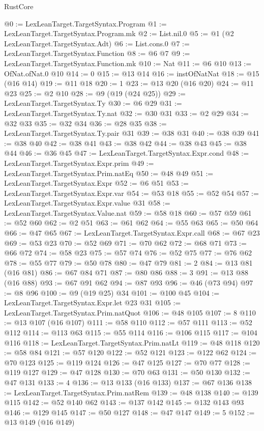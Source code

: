 \begin{lexlean}{RustCore}
\begin{coremodule}
@0 := LexLeanTarget.TargetSyntax.Program
@1 := LexLeanTarget.TargetSyntax.Program.mk
@2 := List.nil.{0}
@5 := @1 (@2 LexLeanTarget.TargetSyntax.Adt)
@6 := List.cons.{0}
@7 := LexLeanTarget.TargetSyntax.Function
@8 := @6 @7
@9 := LexLeanTarget.TargetSyntax.Function.mk
@10 := Nat
@11 := @6 @10
@13 := OfNat.ofNat.{0} @10
@14 := 0
@15 := @13 @14
@16 := instOfNatNat
@18 := @15 (@16 @14)
@19 := @11 @18
@20 := 1
@23 := @13 @20 (@16 @20)
@24 := @11 @23
@25 := @2 @10
@28 := @9 (@19 (@24 @25))
@29 := LexLeanTarget.TargetSyntax.Ty
@30 := @6 @29
@31 := LexLeanTarget.TargetSyntax.Ty.nat
@32 := @30 @31
@33 := @2 @29
@34 := @32 @33
@35 := @32 @34
@36 := @28 @35
@38 := LexLeanTarget.TargetSyntax.Ty.pair @31
@39 := @38 @31
@40 := @38 @39
@41 := @38 @40
@42 := @38 @41
@43 := @38 @42
@44 := @38 @43
@45 := @38 @44
@46 := @36 @45
@47 := LexLeanTarget.TargetSyntax.Expr.cond
@48 := LexLeanTarget.TargetSyntax.Expr.prim
@49 := LexLeanTarget.TargetSyntax.Prim.natEq
@50 := @48 @49
@51 := LexLeanTarget.TargetSyntax.Expr
@52 := @6 @51
@53 := LexLeanTarget.TargetSyntax.Expr.var
@54 := @53 @18
@55 := @52 @54
@57 := LexLeanTarget.TargetSyntax.Expr.value @31
@58 := LexLeanTarget.TargetSyntax.Value.nat
@59 := @58 @18
@60 := @57 @59
@61 := @52 @60
@62 := @2 @51
@63 := @61 @62
@64 := @55 @63
@65 := @50 @64
@66 := @47 @65
@67 := LexLeanTarget.TargetSyntax.Expr.call
@68 := @67 @23
@69 := @53 @23
@70 := @52 @69
@71 := @70 @62
@72 := @68 @71
@73 := @66 @72
@74 := @58 @23
@75 := @57 @74
@76 := @52 @75
@77 := @76 @62
@78 := @55 @77
@79 := @50 @78
@80 := @47 @79
@81 := 2
@84 := @13 @81 (@16 @81)
@86 := @67 @84 @71
@87 := @80 @86
@88 := 3
@91 := @13 @88 (@16 @88)
@93 := @67 @91 @62
@94 := @87 @93
@96 := @46 (@73 @94)
@97 := @8 @96
@100 := @9 (@19 @25) @34
@101 := @100 @45
@104 := LexLeanTarget.TargetSyntax.Expr.let @23 @31
@105 := LexLeanTarget.TargetSyntax.Prim.natQuot
@106 := @48 @105
@107 := 8
@110 := @13 @107 (@16 @107)
@111 := @58 @110
@112 := @57 @111
@113 := @52 @112
@114 := @113 @63
@115 := @55 @114
@116 := @106 @115
@117 := @104 @116
@118 := LexLeanTarget.TargetSyntax.Prim.natLt
@119 := @48 @118
@120 := @58 @84
@121 := @57 @120
@122 := @52 @121
@123 := @122 @62
@124 := @70 @123
@125 := @119 @124
@126 := @47 @125
@127 := @70 @77
@128 := @119 @127
@129 := @47 @128
@130 := @70 @63
@131 := @50 @130
@132 := @47 @131
@133 := 4
@136 := @13 @133 (@16 @133)
@137 := @67 @136
@138 := LexLeanTarget.TargetSyntax.Prim.natRem
@139 := @48 @138
@140 := @139 @115
@142 := @52 @140 @62
@143 := @137 @142
@145 := @132 @143 @93
@146 := @129 @145
@147 := @50 @127
@148 := @47 @147
@149 := 5
@152 := @13 @149 (@16 @149)

\end{coremodule}
\end{lexlean}
